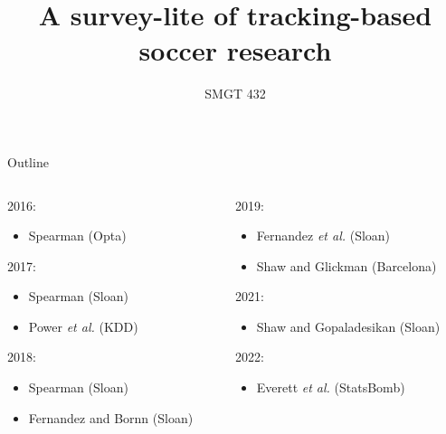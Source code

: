 \documentclass{beamer}
\title{A survey-lite of tracking-based soccer research}
\author{SMGT 432}
\begin{document}
  \begin{frame}
    \maketitle
  \end{frame}

  \begin{frame}{Outline}
    \footnotesize
    \begin{columns}
      \begin{column}{0.5\textwidth}
        2016:
        \begin{itemize}
          \item Spearman (Opta)
        \end{itemize}
        2017:
        \begin{itemize}
          \item Spearman (Sloan)
          \item Power {\it et al.} (KDD)
        \end{itemize}
        2018:
        \begin{itemize}
          \item Spearman (Sloan)
          \item Fernandez and Bornn (Sloan)
        \end{itemize}
      \end{column}
      \begin{column}{0.5\textwidth}
        2019:
        \begin{itemize}
          \item Fernandez {\it et al.} (Sloan)
          \item Shaw and Glickman (Barcelona)
        \end{itemize}
        2021:
        \begin{itemize}
          \item Shaw and Gopaladesikan (Sloan)
        \end{itemize}
        2022:
        \begin{itemize}
          \item Everett {\it et al.} (StatsBomb)
        \end{itemize}
      \end{column}
    \end{columns}
  \end{frame}
\end{document}
